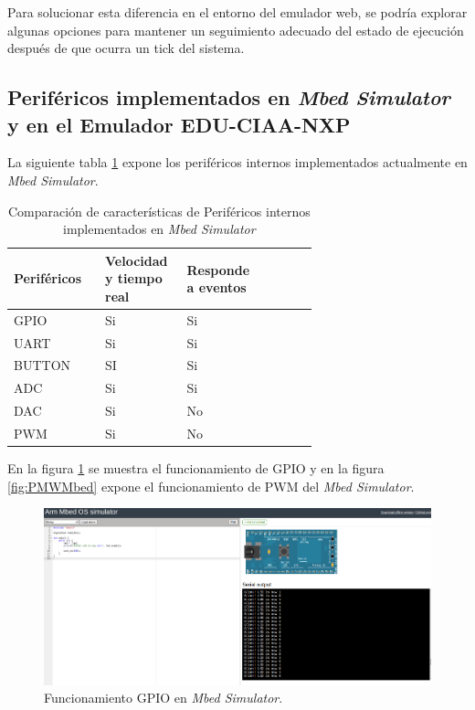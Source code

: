 Para solucionar esta diferencia en el entorno del emulador web, se podría explorar algunas opciones para mantener un seguimiento adecuado del estado de ejecución después de que ocurra un tick del sistema.

\subsection{Periféricos implementados en \textit{Mbed Simulator} y en el Emulador EDU-CIAA-NXP}

La siguiente tabla \ref{tab:perifericosInternosMBED} expone los  periféricos internos implementados actualmente en \textit{Mbed Simulator}.

\begin{table}[h]
\centering
\caption[Comparación de características de periféricos internos implementados en \textit{Mbed Simulator}]{Comparación de características de Periféricos internos implementados en \textit{Mbed Simulator}}
\begin{tabular}{p{0.24\linewidth} p{0.14\linewidth}  p{0.14\linewidth}  p{0.14\linewidth}}
\toprule
\textbf{Periféricos} 
& \textbf{Velocidad y tiempo real}
& \textbf{Responde a eventos}
\\
\midrule
GPIO & Si & Si  \\
UART & Si & Si \\
BUTTON & SI & Si \\
ADC & Si & Si \\
DAC & Si & No \\
PWM & Si & No \\ 
\bottomrule
\hline
\end{tabular}
\label{tab:perifericosInternosMBED}
\end{table}


En la figura \ref{fig:GPIOMbed} se muestra el funcionamiento de GPIO y en la figura \ref{fig:PMWMbed} expone el funcionamiento de PWM del \textit{Mbed Simulator}.


\hfill \break
\hfill \break
\hfill \break
\hfill \break
\hfill \break
\hfill \break
\hfill \break
\hfill \break
\hfill \break
\hfill \break

\begin{figure}[ht]
	\centering
	\includegraphics[scale=.28]{./Figures/GPIOMbed.png}
	\caption{Funcionamiento GPIO en \textit{Mbed Simulator}.}
	\label{fig:GPIOMbed}
\end{figure}



